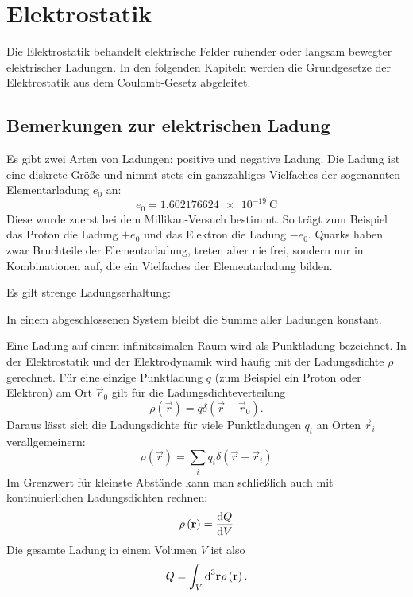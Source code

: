 
\chapter{Elektrostatik\label{elektrostatik}}

Die Elektrostatik behandelt elektrische Felder ruhender oder langsam bewegter elektrischer Ladungen. In den folgenden Kapiteln werden die Grundgesetze der Elektrostatik aus dem Coulomb-Gesetz abgeleitet.

\section{Bemerkungen zur elektrischen Ladung}

Es gibt zwei Arten von Ladungen: positive und negative Ladung. Die Ladung ist eine diskrete Größe und nimmt stets ein ganzzahliges Vielfaches der sogenannten Elementarladung $e_{0}$ an:
\begin{equation*}
	e_{0}=\SI{1.602176624e-19}{\coulomb}
\end{equation*}
Diese wurde zuerst bei dem Millikan-Versuch bestimmt. So trägt zum Beispiel das Proton die Ladung $+e_{0}$ und das Elektron die Ladung $-e_{0}$. Quarks haben zwar Bruchteile der Elementarladung, treten aber nie frei, sondern nur in Kombinationen auf, die ein Vielfaches der Elementarladung bilden.

Es gilt strenge Ladungserhaltung:
\begin{formal}
	In einem abgeschlossenen System bleibt die Summe aller Ladungen konstant.
\end{formal}
Eine Ladung auf einem infinitesimalen Raum wird als Punktladung bezeichnet. In der Elektrostatik und der Elektrodynamik wird häufig mit der Ladungsdichte $\rho $ gerechnet. Für eine einzige Punktladung $q$ (zum Beispiel ein Proton oder Elektron) am Ort $\vec {r}_{0}$ gilt für die Ladungsdichteverteilung
\begin{equation*}
	\rho \left(\vec {r}\right)=q\delta \left(\vec {r}-\vec {r}_{0}\right).
\end{equation*}
Daraus lässt sich die Ladungsdichte für viele Punktladungen $q_{i}$ an Orten $\vec {r}_{i}$ verallgemeinern:
\begin{equation*}
	\rho \left(\vec {r}\right)=\sum _{i}q_{i}\delta \left(\vec {r}-\vec {r}_{i}\right)
\end{equation*}
Im Grenzwert für kleinste Abstände kann man schließlich auch mit kontinuierlichen Ladungsdichten rechnen:
\begin{equation*}
	\rho \left(\mathbf{r}\right)=\frac{\text{d} Q}{\text{d} V}
\end{equation*}
Die gesamte Ladung in einem Volumen $V$ ist also
\begin{equation*}
	Q=\int _{V}\text{d} ^{3}\mathbf{r}\rho \left(\mathbf{r}\right).
\end{equation*}



